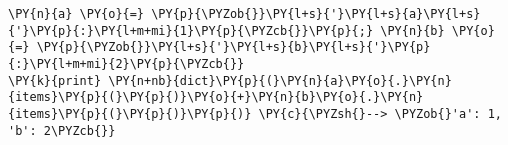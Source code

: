 \begin{Verbatim}[commandchars=\\\{\}]
\PY{n}{a} \PY{o}{=} \PY{p}{\PYZob{}}\PY{l+s}{'}\PY{l+s}{a}\PY{l+s}{'}\PY{p}{:}\PY{l+m+mi}{1}\PY{p}{\PYZcb{}}\PY{p}{;} \PY{n}{b} \PY{o}{=} \PY{p}{\PYZob{}}\PY{l+s}{'}\PY{l+s}{b}\PY{l+s}{'}\PY{p}{:}\PY{l+m+mi}{2}\PY{p}{\PYZcb{}}
\PY{k}{print} \PY{n+nb}{dict}\PY{p}{(}\PY{n}{a}\PY{o}{.}\PY{n}{items}\PY{p}{(}\PY{p}{)}\PY{o}{+}\PY{n}{b}\PY{o}{.}\PY{n}{items}\PY{p}{(}\PY{p}{)}\PY{p}{)} \PY{c}{\PYZsh{}--> \PYZob{}'a': 1, 'b': 2\PYZcb{}}
\end{Verbatim}
